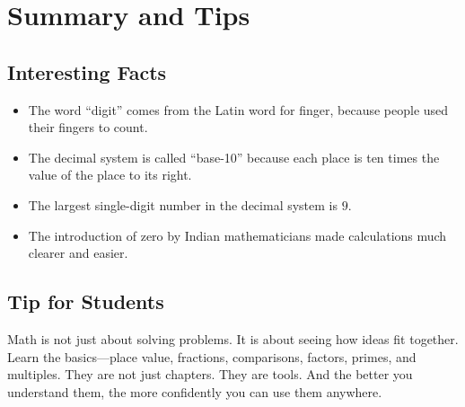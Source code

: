 \cleardoublepage
\section{Summary and Tips}

\subsection*{Interesting Facts}

\begin{itemize}
  \item The word ``digit'' comes from the Latin word for finger, because 
  people used their fingers to count.
  \item The decimal system is called ``base-10'' because each place is ten 
  times the value of the place to its right.
  \item The largest single-digit number in the decimal system is $9$.
  \item The introduction of zero by Indian mathematicians made calculations 
  much clearer and easier.
\end{itemize}

\subsection*{Tip for Students}

Math is not just about solving problems. It is about seeing how ideas fit 
together. Learn the basics---place value, fractions, comparisons, factors, 
primes, and multiples. They are not just chapters. They are tools. And the 
better you understand them, the more confidently you can use them anywhere.
